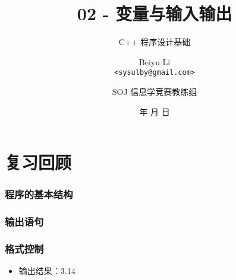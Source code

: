 \title[02 - 变量与输入输出]
{02 - 变量与输入输出}

\subtitle{C++ 程序设计基础}

\author[Beiyu Li]
{Beiyu Li\\
\texttt{<sysulby@gmail.com>}}


\date[\today]
{\number\year 年 \number\month 月 \number\day 日}




\author[sysulby]
{SOJ 信息学竞赛教练组}

\begin{frame}
    \titlepage
\end{frame}
\setcounter{framenumber}{0} %


\section{复习回顾}

\begin{frame}[fragile]
    \frametitle{程序的基本结构}

    
\end{frame}

\begin{frame}[fragile]
    \frametitle{输出语句}

\end{frame}

\begin{frame}[fragile]
    \frametitle{格式控制}

    

    \begin{itemize}
        \item<2-> 输出结果：3.14
    \end{itemize}
\end{frame}


